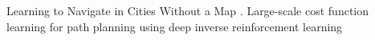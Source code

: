 \documentclass[UTF8]{ctexart}
\begin{document}
Learning to Navigate in Cities Without a Map \cite{mirowski2018learning}. %
Large-scale cost function learning for path planning using deep inverse reinforcement learning \cite{doi:10.1177/0278364917722396}


\end{document}
